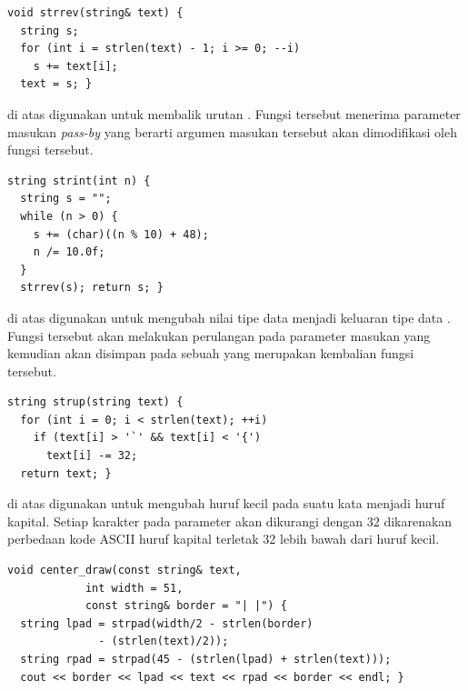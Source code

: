 \documentclass[../main.tex]{subfiles}
\begin{document}
\begin{code}
\begin{verbatim}
void strrev(string& text) {
  string s;
  for (int i = strlen(text) - 1; i >= 0; --i)
    s += text[i];
  text = s; }
\end{verbatim}
\end{code}

{\Script} di atas digunakan untuk membalik urutan . Fungsi tersebut menerima parameter masukan \textit{pass-by} {} yang berarti argumen masukan tersebut akan dimodifikasi oleh fungsi tersebut.

\begin{code}
\begin{verbatim}
string strint(int n) {
  string s = "";
  while (n > 0) {
    s += (char)((n % 10) + 48);
    n /= 10.0f;
  }
  strrev(s); return s; }
\end{verbatim}
\end{code}

{\Script} di atas digunakan untuk mengubah nilai tipe data  menjadi keluaran tipe data . Fungsi tersebut akan melakukan perulangan pada parameter masukan yang kemudian akan disimpan pada sebuah  yang merupakan kembalian fungsi tersebut.

\begin{code}
\begin{verbatim}
string strup(string text) {
  for (int i = 0; i < strlen(text); ++i)
    if (text[i] > '`' && text[i] < '{')
      text[i] -= 32;
  return text; }
\end{verbatim}
\end{code}

{\Script} di atas digunakan untuk mengubah huruf kecil pada suatu kata menjadi huruf kapital. Setiap karakter pada parameter  akan dikurangi dengan 32 dikarenakan perbedaan kode ASCII huruf kapital terletak 32 lebih bawah dari huruf kecil.

\begin{code}
\begin{verbatim}
void center_draw(const string& text,
            int width = 51,
            const string& border = "| |") {
  string lpad = strpad(width/2 - strlen(border)
              - (strlen(text)/2));
  string rpad = strpad(45 - (strlen(lpad) + strlen(text)));
  cout << border << lpad << text << rpad << border << endl; }
\end{verbatim}
\end{code}
\end{document}
